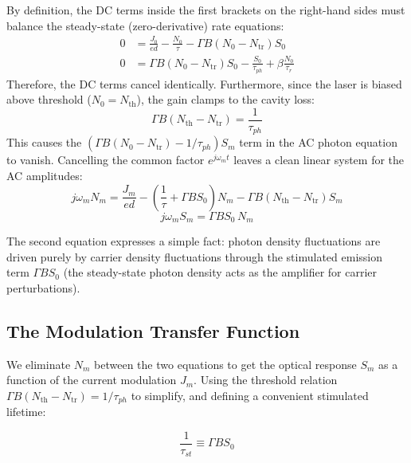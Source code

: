By definition, the DC terms inside the first brackets on the right-hand sides must balance the steady-state (zero-derivative) rate equations:
\begin{align*}
    0 &= \frac{J_0}{ed} - \frac{N_0}{\tau} - \Gamma B(N_0 - N_\text{tr})S_0 \\[6pt]
    0 &= \Gamma B(N_0 - N_\text{tr})S_0 - \frac{S_0}{\tau_{ph}} + \beta\frac{N_0}{\tau_r}
\end{align*}
Therefore, the DC terms cancel identically. Furthermore, since the laser is biased above threshold ($N_0 = N_\text{th}$), the gain clamps to the cavity loss:
\begin{equation*}
    \Gamma B(N_\text{th} - N_\text{tr}) = \frac{1}{\tau_{ph}}
\end{equation*}
This causes the $\left(\Gamma B(N_0 - N_\text{tr}) - 1/\tau_{ph}\right) S_m$ term in the AC photon equation to vanish. Cancelling the common factor $e^{j\omega_m t}$ leaves a clean linear system for the AC amplitudes:
\begin{equation*}
    j\omega_m N_m = \frac{J_m}{ed} - \left(\frac{1}{\tau} + \Gamma B S_0\right)N_m - \Gamma B(N_\text{th} - N_\text{tr})S_m
\end{equation*}
\begin{equation*}
    j\omega_m S_m = \Gamma B S_0\,N_m
\end{equation*}

The second equation expresses a simple fact: photon density fluctuations are driven purely by carrier density fluctuations through the stimulated emission term $\Gamma B S_0$ (the steady-state photon density acts as the amplifier for carrier perturbations).

\subsection{The Modulation Transfer Function}

We eliminate $N_m$ between the two equations to get the optical response $S_m$ as a function of the current modulation $J_m$. Using the threshold relation $\Gamma B(N_\text{th} - N_\text{tr}) = 1/\tau_{ph}$ to simplify, and defining a convenient stimulated lifetime:
\begin{keyresult}
    \begin{equation}
        \frac{1}{\tau_{st}} \equiv \Gamma B S_0
    \end{equation}
\end{keyresult}

